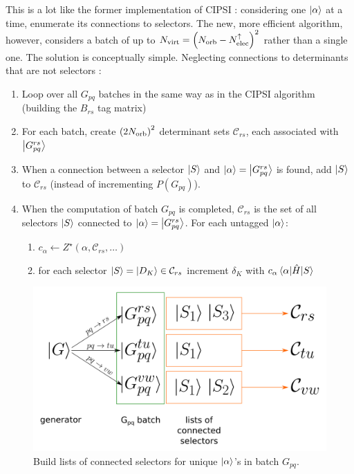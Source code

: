 \documentclass[./thesis.tex]{subfiles}
\begin{document}
This is a lot like the former implementation of CIPSI : considering one ${\ket{\alpha}}$ at a time, enumerate its connections to selectors. The new, more efficient algorithm, however, considers a batch of up to ${N_\text{virt}} = \qty({N_\text{orb}} - {N_\text{elec}^{\uparrow}})^2$ rather than a single one. The solution is conceptually simple. Neglecting connections to determinants that are not selectors :
\begin{enumerate}
\item
Loop over all $G_{pq}$ batches in the same way as in the CIPSI algorithm (building the $B_{rs}$ tag matrix)
\item
For each batch, create ${(2 {N_\text{orb}})}^2$ determinant sets $\mathcal{C}_{rs}$, each associated with $\ket{G^{rs}_{pq}}$
\item
When a connection between a selector $\ket S$ and ${\ket{\alpha}} = \ket {G_{pq}^{rs}}$ is found, add $\ket S$ to $\mathcal{C}_{rs}$ (instead of incrementing $P(G_{pq})$).
\item
When the computation of batch $G_{pq}$ is completed, $\mathcal{C}_{rs}$ is the set of all selectors $\ket S$ connected to ${\ket{\alpha}} = \ket {G_{pq}^{rs}}$. For each untagged ${\ket{\alpha}}$:
\begin{enumerate}
\item
$c_\alpha \gets Z^\star(\alpha, \mathcal{C}_{rs}, \ldots)$
\item
for each selector $\ket{S} = \ket {D_K} \in \mathcal{C}_{rs}$ increment $\delta_K$ with $c_\alpha \mel{\alpha}{\hat{H}}{S}$
\end{enumerate}


\end{enumerate}


\begin{figure}[h!]
	\begin{center}
		\includegraphics[width=0.7\columnwidth]{figures/matrix_dressing/buildlists}
		\caption{Build lists of connected selectors for unique ${\ket{\alpha}}$'s in batch $G_{pq}$.}
		\label{fig:buildlists}
	\end{center}
\end{figure}
\end{document}
